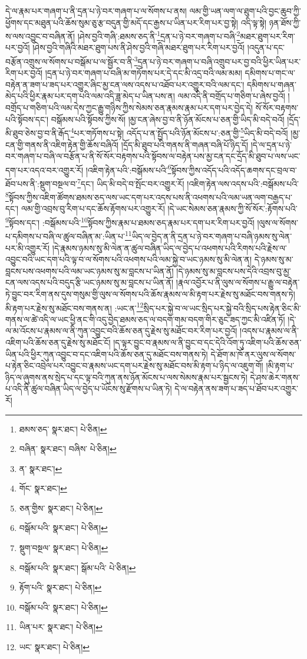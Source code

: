 དེ་ལ་རྣམ་པར་གཞག་པ་ནི་དྲན་པ་ཉེ་བར་གཞག་པ་ལ་སོགས་པ་ནས། ལམ་གྱི་ཡན་ལག་ལ་ཐུག་པའི་བྱང་ཆུབ་ཀྱི་ཕྱོགས་དང་མཐུན་པའི་ཆོས་སུམ་ཅུ་རྩ་བདུན་གྱི་མདོ་དང་རྒྱས་པ་ཡིན་པར་རིག་པར་བྱ་སྟེ། འདི་ལྟ་སྟེ། ཉན་ཐོས་ཀྱི་ས་ལས་འབྱུང་བ་བཞིན་ནོ། །ཤེས་བྱའི་གཞི་:ཐམས་ཅད་ནི་\footnote{ཐམས་ཅད་  སྣར་ཐང་།  པེ་ཅིན། }དྲན་པ་ཉེ་བར་གཞག་པ་བཞི་\footnote{བཞིན་  སྣར་ཐང་། བཞིས་  པེ་ཅིན། }མཐར་ཐུག་པར་རིག་པར་བྱའོ། །ཤེས་བྱའི་གཞིའི་མཐར་ཐུག་པས་ནི་ཤེས་བྱའི་གཞི་མཐར་ཐུག་པར་རིག་པར་བྱའོ། །འདུན་པ་དང་བརྩོན་འགྲུས་ལ་སོགས་པ་བསྒོམ་པ་ལ་སྦྱོར་བ་ནི་\footnote{ན་  སྣར་ཐང་། }དྲན་པ་ཉེ་བར་གཞག་པ་བཞི་འགྲུབ་པར་བྱ་བའི་ཕྱིར་ཡིན་པར་རིག་པར་བྱའོ། །དྲན་པ་ཉེ་བར་གཞག་པ་བཞི་མ་གཏོགས་པར་དེ་དང་མི་འདྲ་བའི་ལམ་མམ། དམིགས་པ་གང་ལ་བརྟེན་ན་ཟག་པ་ཟད་པར་འགྱུར་ཞིང་མྱ་ངན་ལས་འདས་པ་འཐོབ་པར་འགྱུར་བའི་ལམ་དང་། དམིགས་པ་གཞན་མེད་པའི་ཕྱིར་རྣམ་པར་དག་པའི་ལམ་འདི་ཟླ་མེད་པ་ཡིན་པས་ན། ལམ་འདི་ནི་བགྲོད་པ་གཅིག་པ་ཞེས་བྱའོ། །བགྲོད་པ་གཅིག་པའི་ལམ་དེས་ཀྱང་རྒྱུ་གཉིས་ཀྱིས་སེམས་ཅན་རྣམས་རྣམ་པར་དག་པར་བྱེད་དེ། སོ་སོར་བརྟགས་པའི་སྟོབས་དང་། བསྒོམས་པའི་སྟོབས་ཀྱིས་སོ། །མྱ་ངན་ཞེས་བྱ་བ་ནི་ཉོན་མོངས་པ་ཅན་གྱི་ཡིད་མི་བདེ་བའོ། །དྲོད་མི་ཐུབ་ཅེས་བྱ་བ་ནི་རྒོད་\footnote{གོང་  སྣར་ཐང་། }པར་གཏོགས་པ་སྟེ། འདོད་པ་ན་སྤྱོད་པའི་ཉོན་མོངས་པ་:ཅན་གྱི་\footnote{ཅན་གྱིས་  སྣར་ཐང་།  པེ་ཅིན། }ཡིད་མི་བདེ་བའོ། །མྱ་ངན་གྱི་གནས་ནི་འཇིག་རྟེན་གྱི་ཆོས་བཞིའོ། །དྲོད་མི་ཐུབ་པའི་གནས་ནི་གཞན་བཞི་པོ་ཉིད་དོ། །དེ་ལ་དྲན་པ་ཉེ་བར་གཞག་པ་བཞི་ལ་བརྩོན་པ་ནི་སོ་སོར་བརྟགས་པའི་སྟོབས་ལ་བརྟེན་པས་མྱ་ངན་དང་དྲོད་མི་ཐུབ་པ་ལས་ཡང་དག་པར་འདའ་བར་འགྱུར་རོ། །འཇིག་རྟེན་པའི་:བསྒོམས་པའི་\footnote{བསྒོམ་པའི་  སྣར་ཐང་།  པེ་ཅིན། }སྟོབས་ཀྱིས་འདོད་པའི་འདོད་ཆགས་དང་བྲལ་བ་ཐོབ་པས་ནི་:སྡུག་བསྔལ་བ་\footnote{སྡུག་བསྔལ་  སྣར་ཐང་།  པེ་ཅིན། }དང་། ཡིད་མི་བདེ་བ་སྤོང་བར་འགྱུར་རོ། །འཇིག་རྟེན་ལས་འདས་པའི་:བསྒོམས་པའི་\footnote{བསྒོམ་པའི་  སྣར་ཐང་། སྒོམ་པའི་  པེ་ཅིན། }སྟོབས་ཀྱིས་འཇིག་ཚོགས་ཐམས་ཅད་ལས་ཡང་དག་པར་འདས་པས་ནི་འཕགས་པའི་ལམ་ཡན་ལག་བརྒྱད་པ་དང་། ལམ་གྱི་འབྲས་བུ་རིག་པ་དང་ཆོས་རྟོགས་པར་འགྱུར་རོ། །དེ་ཡང་སེམས་ཅན་རྣམས་ཀྱི་སོ་སོར་:རྟོགས་པའི་\footnote{རྟོག་པའི་  སྣར་ཐང་།  པེ་ཅིན། }སྟོབས་དང་། :བསྒོམས་པའི་\footnote{བསྒོམ་པའི་  སྣར་ཐང་།  པེ་ཅིན། }སྟོབས་ཀྱིས་རྣམ་པ་ཐམས་ཅད་རྣམ་པར་དག་པར་རིག་པར་བྱའོ། །ལུས་ལ་སོགས་པ་དམིགས་པ་བཞི་ལ་ཚུལ་བཞིན་མ་:ཡིན་པ་\footnote{ཡིན་པར་  སྣར་ཐང་།  པེ་ཅིན། }ཡིད་ལ་བྱེད་ན་ནི་དྲན་པ་ཉེ་བར་གཞག་པ་བཞི་ཉམས་སུ་ལེན་པར་མི་འགྱུར་རོ། །དེ་རྣམས་ཉམས་སུ་མི་ལེན་ན་ཚུལ་བཞིན་ཡིད་ལ་བྱེད་པ་འཕགས་པའི་རིགས་པའི་རྗེས་ལ་འབྱུང་བའི་ཡང་དག་པའི་ལྟ་བ་ལ་སོགས་པའི་འཕགས་པའི་ལམ་སྐྱེ་བ་ཡང་ཉམས་སུ་མི་ལེན་ན། དེ་ཉམས་སུ་མ་བླངས་པས་འཕགས་པའི་ལམ་ཡང་ཉམས་སུ་མ་བླངས་པ་ཡིན་ནོ། །དེ་ཉམས་སུ་མ་བླངས་པས་དེའི་འབྲས་བུ་མྱ་ངན་ལས་འདས་པའི་བདུད་རྩི་ཡང་ཉམས་སུ་མ་བླངས་པ་ཡིན་ནོ། །རྣལ་འབྱོར་པ་ནི་ལུས་ལ་སོགས་པ་རྒྱུ་ལ་བརྟེན་ཏེ་བྱུང་བར་རིག་ནས་དུས་གསུམ་གྱི་ལུས་ལ་སོགས་པའི་ཆོས་རྣམས་ལ་མི་རྟག་པར་རྗེས་སུ་མཐོང་བས་གནས་ཏེ། མི་རྟག་པར་རྗེས་སུ་མཐོང་བས་གནས་ན། :ཡང་ན་\footnote{ཡང་  སྣར་ཐང་།  པེ་ཅིན། }སྲིད་པར་སྐྱེ་བ་ལ་ཡང་སྲིད་པར་སྐྱེ་བའི་སྲིད་པས་རྟེན་ཅིང་མི་གནས་ལ་ཚེ་འདི་ལ་ཡང་ཕྱི་ནང་གི་འདུ་བྱེད་ཐམས་ཅད་ལ་བདག་གམ་བདག་གིར་ཅུང་ཟད་ཀྱང་མི་འཛིན་ཏོ། །དེ་ལ་མ་འོངས་པ་རྣམས་ལ་ནི་ཀུན་འབྱུང་བའི་ཆོས་ཅན་དུ་རྗེས་སུ་མཐོང་བར་རིག་པར་བྱའོ། །འདས་པ་རྣམས་ལ་ནི་འཇིག་པའི་ཆོས་ཅན་དུ་རྗེས་སུ་མཐོང་ངོ། །ད་ལྟར་བྱུང་བ་རྣམས་ལ་ནི་བྱུང་བ་དང་དེའི་འོག་ཏུ་འཇིག་པའི་ཆོས་ཅན་ཡིན་པའི་ཕྱིར་ཀུན་འབྱུང་བ་དང་འཇིག་པའི་ཆོས་ཅན་དུ་མཐོང་བས་གནས་ཏེ། དེ་ཐོག་མ་ཁོ་ནར་ལུས་ལ་སོགས་པ་རྟེན་ཅིང་འབྲེལ་པར་འབྱུང་བ་རྣམས་ཡང་དག་པར་རྗེས་སུ་མཐོང་བས་མི་རྟག་པ་ཉིད་ལ་འཇུག་གོ། །མི་རྟག་པ་ཉིད་ལ་ཞུགས་ནས་སྲེད་པ་དང་ལྟ་བའི་ཀུན་ནས་ཉོན་མོངས་པ་ལས་སེམས་རྣམ་པར་སྦྱངས་ཏེ། དེ་ཤས་ཆེར་གནས་པ་འདི་ནི་ཚུལ་བཞིན་ཡིད་ལ་བྱེད་པ་ཡོངས་སུ་རྫོགས་པ་ཡིན་ཏེ། དེ་ལ་བརྟེན་ནས་ཟག་པ་ཟད་པ་ཐོབ་པར་འགྱུར་རོ། 